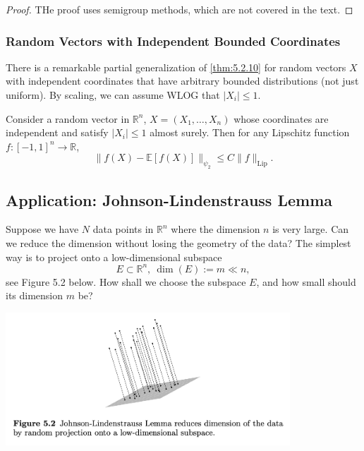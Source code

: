 \begin{proof}
THe proof uses semigroup methods, which are not covered in the text.
\end{proof}


\subsubsection{Random Vectors with Independent Bounded Coordinates}
There is a remarkable partial generalization of \cref{thm:5.2.10} for random vectors $X$ with independent 
coordinates that have arbitrary bounded distributions (not just uniform). By scaling, we can assume WLOG that 
$|X_i| \leq 1$.

\begin{theorem}
\label{thm:5.2.12}
Consider a random vector in $\mathbb{R}^n$, 
$X = (X_1, \dots, X_n)$ whose coordinates are independent and satisfy $|X_i| \leq 1$ 
almost surely. Then for any Lipschitz function $f: [-1, 1]^n \to \mathbb{R}$, 
\[ \lVert f(X) - \mathbb{E}[f(X)] \rVert_{\psi_2} \leq C \lVert f \rVert_{\mathrm{Lip}}. \]
\end{theorem}



\subsection{Application: Johnson-Lindenstrauss Lemma}
Suppose we have $N$ data points in $\mathbb{R}^n$ where the dimension $n$ is very large. Can we reduce the 
dimension without losing the geometry of the data? The simplest way is to project onto a low-dimensional 
subspace 
\[ E \subset \mathbb{R}^n, \ \dim{(E)} := m \ll n, \]
see Figure 5.2 below. How shall we choose the subspace $E$, and how small should its dimension $m$ be?

\begin{center}
	\includegraphics[width=0.8\textwidth]{Chapter 5/fig5-2.png}
\end{center}

